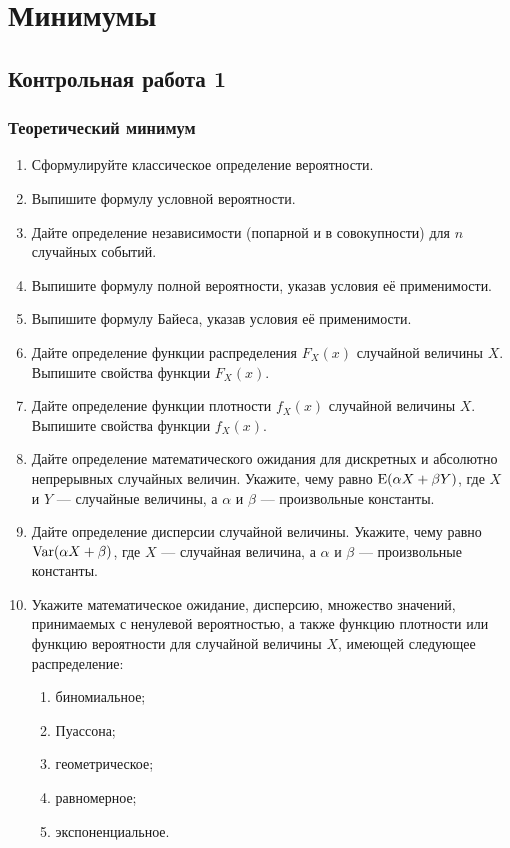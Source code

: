 \newpage
\thispagestyle{empty}
\section{Минимумы}

\subsection{Контрольная работа 1}


\subsubsection*{Теоретический минимум}


\begin{enumerate}
	\item Сформулируйте классическое определение вероятности.
	\item Выпишите формулу условной вероятности.
	\item Дайте определение независимости (попарной и в совокупности) для $n$ случайных событий.
	\item Выпишите формулу полной вероятности, указав условия её применимости.
	\item Выпишите формулу Байеса, указав условия её применимости.
	\item Дайте определение функции распределения $F_{X}(x)$ случайной величины $X$. 
	Выпишите свойства функции $F_{X}(x)$. 
	\item Дайте определение функции плотности $f_{X}(x)$ случайной величины $X$. 
	Выпишите свойства функции $f_{X}(x)$.
	\item Дайте определение математического ожидания для дискретных и абсолютно непрерывных случайных величин. 
	Укажите, чему равно $\operatorname{E}(\alpha X+\beta Y)$, где $X$ и $Y$ — случайные величины, а $\alpha$ и $\beta$ — произвольные константы.
	\item Дайте определение дисперсии случайной величины. 
	Укажите, чему равно $\operatorname{Var}(\alpha X+\beta)$, где $X$ — случайная величина, 
	а $\alpha$ и $\beta$ — произвольные константы.
	\item Укажите математическое ожидание, дисперсию, множество значений, 
	принимаемых с ненулевой вероятностью, а также функцию плотности или функцию вероятности для случайной величины $X$, 
	имеющей следующее распределение:
	\begin{enumerate}
	\item биномиальное;
	\item Пуассона;
	\item геометрическое;
	\item равномерное;
	\item экспоненциальное.
	\end{enumerate}
\end{enumerate}

